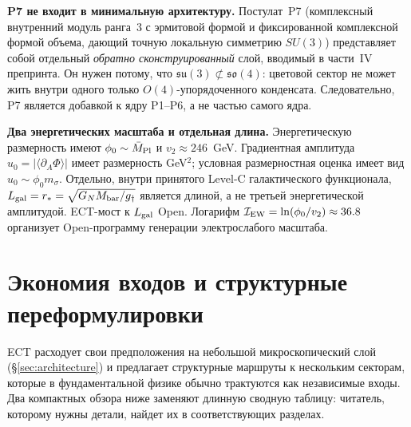 \documentclass[11pt,a4paper]{article}
\begin{document}
\textbf{P7 не входит в минимальную архитектуру.}
Постулат~P7 (комплексный внутренний модуль ранга~3 с эрмитовой
формой и фиксированной комплексной формой объема, дающий точную
локальную симметрию $SU(3)$) представляет собой отдельный
\emph{обратно сконструированный} слой, вводимый в части~IV
препринта. Он нужен потому, что $\mathfrak{su}(3)\not\subset
\mathfrak{so}(4)$: цветовой сектор не может жить внутри
одного только $O(4)$-упорядоченного конденсата. Следовательно,
P7 является добавкой к ядру P1--P6, а не частью самого ядра.

\textbf{Два энергетических масштаба и отдельная длина.}
Энергетическую размерность имеют $\phi_0\sim\bar M_{\rm Pl}$ и
$v_2\approx246$~GeV. Градиентная амплитуда
$u_0=|\langle\partial_A\Phi\rangle|$ имеет размерность GeV$^2$;
условная размерностная оценка имеет вид $u_0\sim\phi_0m_\sigma$.
Отдельно, внутри принятого Level-C галактического функционала,
$L_{\rm gal}=r_*=\sqrt{G_NM_{\rm bar}/g_\dagger}$ является длиной,
а не третьей энергетической амплитудой. ECT-мост к $L_{\rm gal}$ Open.
Логарифм $\mathcal I_{\rm EW}=\ln(\phi_0/v_2)\approx36.8$
организует Open-программу генерации электрослабого масштаба.

\section{Экономия входов и структурные переформулировки}
\label{sec:input_economy}

ECT расходует свои предположения на небольшой микроскопический
слой (\S\ref{sec:architecture}) и предлагает структурные маршруты
к нескольким секторам, которые в фундаментальной физике обычно
трактуются как независимые входы. Два компактных обзора ниже
заменяют длинную сводную таблицу: читатель, которому нужны детали,
найдет их в соответствующих разделах.
\end{document}
